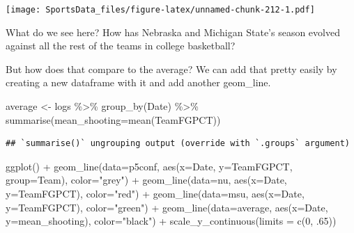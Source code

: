 \documentclass[
]{book}
\newenvironment{Shaded}{\begin{snugshade}}{\end{snugshade}}
\newcommand{\AttributeTok}[1]{\textcolor[rgb]{0.77,0.63,0.00}{#1}}
\newcommand{\DecValTok}[1]{\textcolor[rgb]{0.00,0.00,0.81}{#1}}
\newcommand{\FunctionTok}[1]{\textcolor[rgb]{0.00,0.00,0.00}{#1}}
\newcommand{\NormalTok}[1]{#1}
\newcommand{\OtherTok}[1]{\textcolor[rgb]{0.56,0.35,0.01}{#1}}
\newcommand{\SpecialCharTok}[1]{\textcolor[rgb]{0.00,0.00,0.00}{#1}}
\newcommand{\StringTok}[1]{\textcolor[rgb]{0.31,0.60,0.02}{#1}}
\begin{document}
\texttt{[image: SportsData\_files/figure-latex/unnamed-chunk-212-1.pdf]}

What do we see here? How has Nebraska and Michigan State's season evolved against all the rest of the teams in college basketball?

But how does that compare to the average? We can add that pretty easily by creating a new dataframe with it and add another geom\_line.

\begin{Shaded}
\begin{Highlighting}[]
\NormalTok{average }\OtherTok{\textless{}{-}}\NormalTok{ logs }\SpecialCharTok{\%\textgreater{}\%} \FunctionTok{group\_by}\NormalTok{(Date) }\SpecialCharTok{\%\textgreater{}\%} \FunctionTok{summarise}\NormalTok{(}\AttributeTok{mean\_shooting=}\FunctionTok{mean}\NormalTok{(TeamFGPCT))}
\end{Highlighting}
\end{Shaded}

\begin{verbatim}
## `summarise()` ungrouping output (override with `.groups` argument)
\end{verbatim}

\begin{Shaded}
\begin{Highlighting}[]
\FunctionTok{ggplot}\NormalTok{() }\SpecialCharTok{+} 
  \FunctionTok{geom\_line}\NormalTok{(}\AttributeTok{data=}\NormalTok{p5conf, }\FunctionTok{aes}\NormalTok{(}\AttributeTok{x=}\NormalTok{Date, }\AttributeTok{y=}\NormalTok{TeamFGPCT, }\AttributeTok{group=}\NormalTok{Team), }\AttributeTok{color=}\StringTok{"grey"}\NormalTok{) }\SpecialCharTok{+} 
  \FunctionTok{geom\_line}\NormalTok{(}\AttributeTok{data=}\NormalTok{nu, }\FunctionTok{aes}\NormalTok{(}\AttributeTok{x=}\NormalTok{Date, }\AttributeTok{y=}\NormalTok{TeamFGPCT), }\AttributeTok{color=}\StringTok{"red"}\NormalTok{) }\SpecialCharTok{+} 
  \FunctionTok{geom\_line}\NormalTok{(}\AttributeTok{data=}\NormalTok{msu, }\FunctionTok{aes}\NormalTok{(}\AttributeTok{x=}\NormalTok{Date, }\AttributeTok{y=}\NormalTok{TeamFGPCT), }\AttributeTok{color=}\StringTok{"green"}\NormalTok{) }\SpecialCharTok{+} 
  \FunctionTok{geom\_line}\NormalTok{(}\AttributeTok{data=}\NormalTok{average, }\FunctionTok{aes}\NormalTok{(}\AttributeTok{x=}\NormalTok{Date, }\AttributeTok{y=}\NormalTok{mean\_shooting), }\AttributeTok{color=}\StringTok{"black"}\NormalTok{) }\SpecialCharTok{+} 
  \FunctionTok{scale\_y\_continuous}\NormalTok{(}\AttributeTok{limits =} \FunctionTok{c}\NormalTok{(}\DecValTok{0}\NormalTok{, .}\DecValTok{65}\NormalTok{))}
\end{Highlighting}
\end{Shaded}
\end{document}
